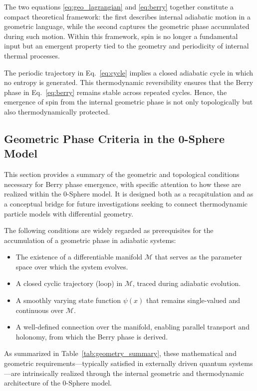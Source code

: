 \documentclass[%
 reprint,
 amsmath,amssymb,
 aps,
]{revtex4-1}
\numberwithin{equation}{section}%
\begin{document}
The two equations \eqref{eq:geo_lagrangian} and \eqref{eq:berry} together constitute a compact theoretical framework: the first describes internal adiabatic motion in a geometric language, while the second captures the geometric phase accumulated during such motion. Within this framework, spin is no longer a fundamental input but an emergent property tied to the geometry and periodicity of internal thermal processes.

The periodic trajectory in Eq.~\eqref{eq:cycle} implies a closed adiabatic cycle in which no entropy is generated. This thermodynamic reversibility ensures that the Berry phase in Eq.~\eqref{eq:berry} remains stable across repeated cycles. Hence, the emergence of spin from the internal geometric phase is not only topologically but also thermodynamically protected.

\newpage

\subsection{Geometric Phase Criteria in the 0-Sphere Model} \label{subsec:geometric_criteria}

This section provides a summary of the geometric and topological conditions necessary for Berry phase emergence, with specific attention to how these are realized within the 0-Sphere model. It is designed both as a recapitulation and as a conceptual bridge for future investigations seeking to connect thermodynamic particle models with differential geometry.

The following conditions are widely regarded as prerequisites for the accumulation of a geometric phase in adiabatic systems:

\begin{itemize}
  \item The existence of a differentiable manifold \( \mathcal{M} \) that serves as the parameter space over which the system evolves.
  \item A closed cyclic trajectory (loop) in \( \mathcal{M} \), traced during adiabatic evolution.
  \item A smoothly varying state function \( \psi(x) \) that remains single-valued and continuous over \( \mathcal{M} \).
  \item A well-defined connection over the manifold, enabling parallel transport and holonomy, from which the Berry phase is derived.
\end{itemize}

As summarized in Table~\ref{tab:geometry_summary}, these mathematical and geometric requirements—typically satisfied in externally driven quantum systems—are intrinsically realized through the internal geometric and thermodynamic architecture of the 0-Sphere model.
\end{document}
